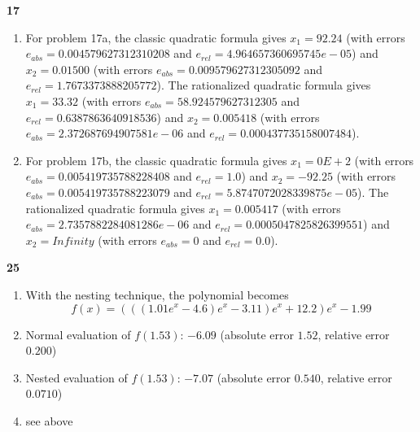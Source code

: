 \documentclass{article}
\begin{document}
\textbf{17}
\begin{enumerate}
    \item 
    For problem 17a, the classic quadratic formula gives $x_1 = 92.24$ (with errors $e_{abs} = 0.004579627312310208$ and $e_{rel} = 4.964657360695745e-05$) and 
    $x_2 = 0.01500$ (with errors $e_{abs} = 0.009579627312305092$ and $e_{rel} = 1.7673373888205772$). The rationalized quadratic formula gives $x_1 = 33.32$ (with errors $e_{abs} = 58.924579627312305$ and $e_{rel} = 0.6387863640918536$) and $x_2 = 0.005418$ (with errors $e_{abs} = 2.372687694907581e-06$ and $e_{rel} = 0.000437735158007484$). 

    \item
    For problem 17b, the classic quadratic formula gives $x_1 = 0E+2$ (with errors $e_{abs} = 0.005419735788228408$ and $e_{rel} = 1.0$) and $x_2 = -92.25$ (with errors $e_{abs} = 0.005419735788223079$ and $e_{rel} = 5.8747072028339875e-05$). The rationalized quadratic formula gives $x_1 = 0.005417$ (with errors $e_{abs} = 2.7357882284081286e-06$ and $e_{rel} = 0.0005047825826399551$) and $x_2 = Infinity$ (with errors $e_{abs} = 0$ and $e_{rel} = 0.0$).
\end{enumerate}


\textbf{25}
\begin{enumerate}
    \item 
    With the nesting technique, the polynomial becomes
    $$f(x) = (((1.01e^x - 4.6)e^{x} - 3.11)e^{x} + 12.2)e^{x} - 1.99$$

    \item
    Normal evaluation of $f(1.53)$: $-6.09$ (absolute error $1.52$, relative error $0.200$)

    \item
    Nested evaluation of $f(1.53)$: $-7.07$ (absolute error $0.540$, relative error $0.0710$)

    \item
    see above
\end{enumerate}
\end{document}
